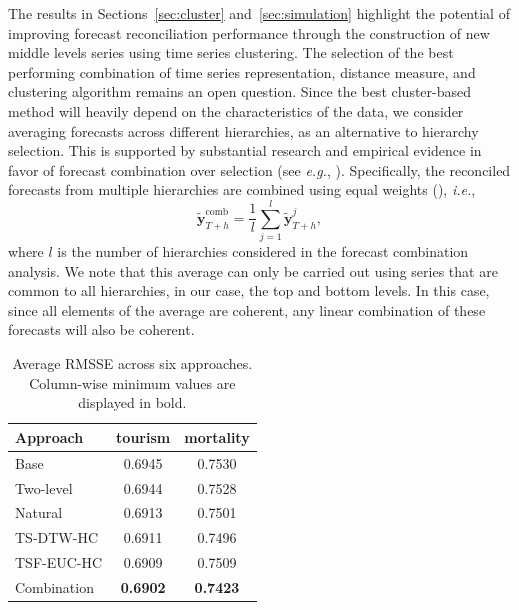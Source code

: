 \documentclass[a4paper,review,12pt,authoryear]{elsarticle}
\begin{document}
The results in Sections~\ref{sec:cluster} and~\ref{sec:simulation} highlight the potential of improving forecast reconciliation performance through the construction of new middle levels series using time series clustering. The selection of the best performing combination of time series representation, distance measure, and clustering algorithm remains an open question. Since the best cluster-based method will heavily depend on the characteristics of the data, %
we consider averaging forecasts across different hierarchies, as an alternative to hierarchy selection. This is supported by substantial research and empirical evidence in favor of forecast combination over selection (see \textit{e.g.}, \citealp{elliottForecastingEconomicsFinance2016}). Specifically, the reconciled forecasts from multiple hierarchies are combined using equal weights (\citealp{wangForecastCombinations50year2022}), \textit{i.e.},
\[
  \tilde{\boldsymbol{y}}_{T+h}^{\text{comb}} = \frac{1}{l} \sum_{j=1}^l \tilde{\boldsymbol{y}}_{T+h}^j,
\] 
{\color{purple}where $l$ is the number of hierarchies considered in the forecast combination analysis.}
We note that this average can only be carried out using series that are common to all hierarchies, in our case, the top and bottom levels. In this case, since all elements of the average are coherent, any linear combination of these forecasts will also be coherent. \\



\begin{table}[h!]
    \centering
    \caption{\label{tab:P4_RMSSE}Average RMSSE across six approaches. Column-wise minimum values are displayed in bold.}
    \begin{tabular}{lcc}\toprule
       Approach & tourism & mortality \\ \midrule
        Base & 0.6945 & 0.7530 \\ 
        Two-level & 0.6944 & 0.7528 \\ 
        Natural & 0.6913 & 0.7501 \\ 
        TS-DTW-HC & 0.6911 & 0.7496 \\ 
        TSF-EUC-HC & 0.6909 & 0.7509 \\ 
        Combination & \textbf{0.6902} & \textbf{0.7423} \\ \bottomrule
    \end{tabular}
\end{table}
\end{document}
